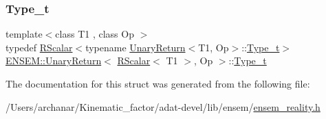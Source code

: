 \subsubsection{\texorpdfstring{Type\_t}{Type\_t}\hspace{0.1cm}{\footnotesize\ttfamily [3/3]}}
{\footnotesize\ttfamily template$<$class T1 , class Op $>$ \\
typedef \mbox{\hyperlink{classENSEM_1_1RScalar}{R\+Scalar}}$<$typename \mbox{\hyperlink{structENSEM_1_1UnaryReturn}{Unary\+Return}}$<$T1, Op$>$\+::\mbox{\hyperlink{structENSEM_1_1UnaryReturn_3_01RScalar_3_01T1_01_4_00_01Op_01_4_a406bd7c6dcdb1f1ee9e383de2e830d7c}{Type\+\_\+t}}$>$ \mbox{\hyperlink{structENSEM_1_1UnaryReturn}{E\+N\+S\+E\+M\+::\+Unary\+Return}}$<$ \mbox{\hyperlink{classENSEM_1_1RScalar}{R\+Scalar}}$<$ T1 $>$, Op $>$\+::\mbox{\hyperlink{structENSEM_1_1UnaryReturn_3_01RScalar_3_01T1_01_4_00_01Op_01_4_a406bd7c6dcdb1f1ee9e383de2e830d7c}{Type\+\_\+t}}}



The documentation for this struct was generated from the following file\+:\begin{DoxyCompactItemize}
\item 
/\+Users/archanar/\+Kinematic\+\_\+factor/adat-\/devel/lib/ensem/\mbox{\hyperlink{adat-devel_2lib_2ensem_2ensem__reality_8h}{ensem\+\_\+reality.\+h}}\end{DoxyCompactItemize}
